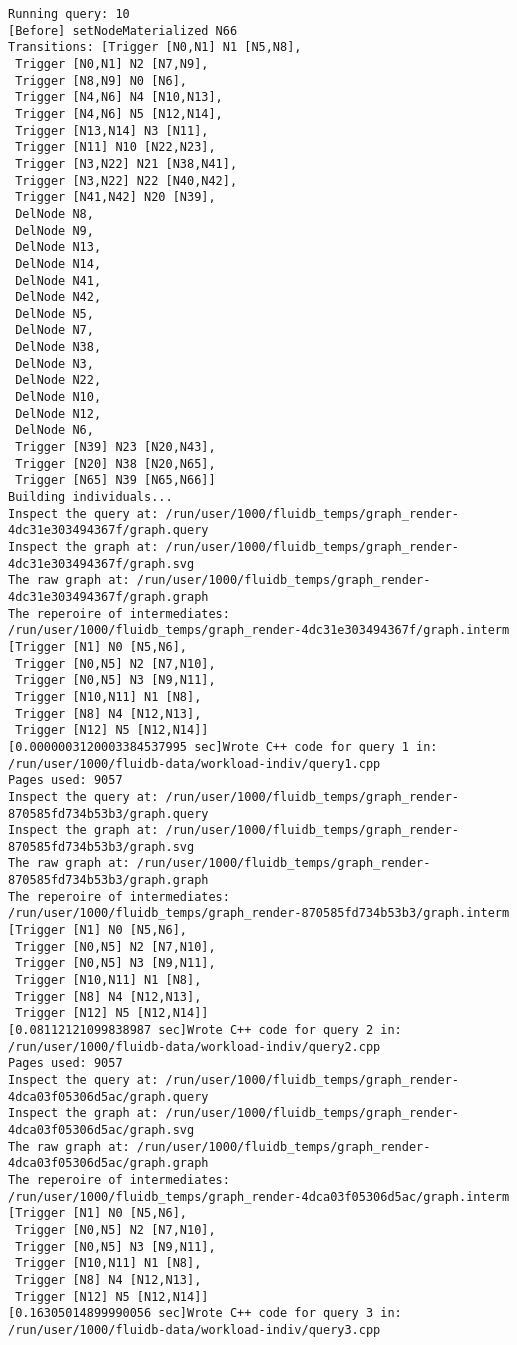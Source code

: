 \begin{code}
\begin{verbatim}
Running query: 10
[Before] setNodeMaterialized N66
Transitions: [Trigger [N0,N1] N1 [N5,N8],
 Trigger [N0,N1] N2 [N7,N9],
 Trigger [N8,N9] N0 [N6],
 Trigger [N4,N6] N4 [N10,N13],
 Trigger [N4,N6] N5 [N12,N14],
 Trigger [N13,N14] N3 [N11],
 Trigger [N11] N10 [N22,N23],
 Trigger [N3,N22] N21 [N38,N41],
 Trigger [N3,N22] N22 [N40,N42],
 Trigger [N41,N42] N20 [N39],
 DelNode N8,
 DelNode N9,
 DelNode N13,
 DelNode N14,
 DelNode N41,
 DelNode N42,
 DelNode N5,
 DelNode N7,
 DelNode N38,
 DelNode N3,
 DelNode N22,
 DelNode N10,
 DelNode N12,
 DelNode N6,
 Trigger [N39] N23 [N20,N43],
 Trigger [N20] N38 [N20,N65],
 Trigger [N65] N39 [N65,N66]]
Building individuals...
Inspect the query at: /run/user/1000/fluidb_temps/graph_render-4dc31e303494367f/graph.query
Inspect the graph at: /run/user/1000/fluidb_temps/graph_render-4dc31e303494367f/graph.svg
The raw graph at: /run/user/1000/fluidb_temps/graph_render-4dc31e303494367f/graph.graph
The reperoire of intermediates: /run/user/1000/fluidb_temps/graph_render-4dc31e303494367f/graph.interm
[Trigger [N1] N0 [N5,N6],
 Trigger [N0,N5] N2 [N7,N10],
 Trigger [N0,N5] N3 [N9,N11],
 Trigger [N10,N11] N1 [N8],
 Trigger [N8] N4 [N12,N13],
 Trigger [N12] N5 [N12,N14]]
[0.0000003120003384537995 sec]Wrote C++ code for query 1 in: /run/user/1000/fluidb-data/workload-indiv/query1.cpp
Pages used: 9057
Inspect the query at: /run/user/1000/fluidb_temps/graph_render-870585fd734b53b3/graph.query
Inspect the graph at: /run/user/1000/fluidb_temps/graph_render-870585fd734b53b3/graph.svg
The raw graph at: /run/user/1000/fluidb_temps/graph_render-870585fd734b53b3/graph.graph
The reperoire of intermediates: /run/user/1000/fluidb_temps/graph_render-870585fd734b53b3/graph.interm
[Trigger [N1] N0 [N5,N6],
 Trigger [N0,N5] N2 [N7,N10],
 Trigger [N0,N5] N3 [N9,N11],
 Trigger [N10,N11] N1 [N8],
 Trigger [N8] N4 [N12,N13],
 Trigger [N12] N5 [N12,N14]]
[0.08112121099838987 sec]Wrote C++ code for query 2 in: /run/user/1000/fluidb-data/workload-indiv/query2.cpp
Pages used: 9057
Inspect the query at: /run/user/1000/fluidb_temps/graph_render-4dca03f05306d5ac/graph.query
Inspect the graph at: /run/user/1000/fluidb_temps/graph_render-4dca03f05306d5ac/graph.svg
The raw graph at: /run/user/1000/fluidb_temps/graph_render-4dca03f05306d5ac/graph.graph
The reperoire of intermediates: /run/user/1000/fluidb_temps/graph_render-4dca03f05306d5ac/graph.interm
[Trigger [N1] N0 [N5,N6],
 Trigger [N0,N5] N2 [N7,N10],
 Trigger [N0,N5] N3 [N9,N11],
 Trigger [N10,N11] N1 [N8],
 Trigger [N8] N4 [N12,N13],
 Trigger [N12] N5 [N12,N14]]
[0.16305014899990056 sec]Wrote C++ code for query 3 in: /run/user/1000/fluidb-data/workload-indiv/query3.cpp

\end{verbatim}
\end{code}
